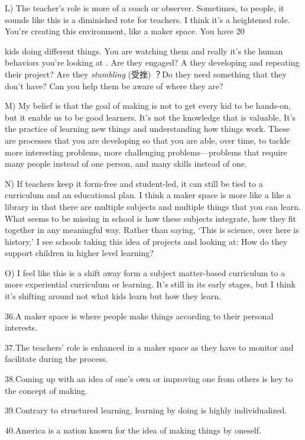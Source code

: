 \documentclass[UTF8,11pt]{ctexart}
\begin{document}
L) The teacher’s role is more of a coach or observer. Sometimes, to people, it sounds like this is a diminished rote for teachers. I think it’s a heightened role. You’re creating this environment, like a maker space. You have 20


kids doing different things. You are watching them and really it’s the human behaviors you’re looking at . Are they engaged? A they developing and repeating their project? Are they\textit{ stumbling} (受挫) ？Do they need something that they don’t have? Can you help them be aware of where they are?


M) My belief is that the goal of making is not to get every kid to be hands-on, but it enable us to be good learners. It’s not the knowledge that is valuable, It’s the practice of learning new things and understanding how things work. These are processes that you are developing so that you are able, over time, to tackle more interesting problems, more challenging problems—problems that require many people instead of one person, and many skills instead of one.


N) If teachers keep it form-free and student-led, it can still be tied to a curriculum and an educational plan. I think a maker space is more like a like a library in that there are multiple subjects and multiple things that you can learn. What seems to be missing in school is how these subjects integrate, how they fit together in any meaningful way. Rather than saying, ‘This is science, over here is history,’ I see schools taking this idea of projects and looking at: How do they support children in higher level learning?


O) I feel like this is a shift away form a subject matter-based curriculum to a more experiential curriculum or learning. It’s still in its early stages, but I think it’s shifting around not what kids learn but how they learn.


36.A maker space is where people make things according to their personal interests.


37.The teachers’ role is enhanced in a maker space as they have to monitor and facilitate during the process.


38.Coming up with an idea of one’s own or improving one from others is key to the concept of making.


39.Contrary to structured learning, learning by doing is highly individualized.


40.America is a nation known for the idea of making things by oneself.
\end{document}

